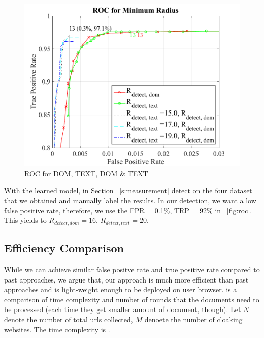 \begin{figure}[t]
  \centering
  \includegraphics[width=.5\textwidth]{fig/roc}
  \caption{ROC for DOM, TEXT, DOM \& TEXT}
  \label{fig:roc}
\end{figure}

With the learned model, in Section ~\autoref{s:measurement} 
detect on the four dataset that we obtained and
manually label the results. In our detection, we want a low false positive rate,
therefore, we use the FPR = 0.1\%, TRP = 92\% in ~\autoref{fig:roc}. This yields
to $R_{detect, dom} = 16$, $R_{detect, text} = 20$.


\subsection{Efficiency Comparison}
While we can achieve similar false positve rate and true positive rate compared
to past approaches, we argue that, our approach is much more efficient than past
approaches and is light-weight enough to be deployed on user browser.
 is a comparison of time complexity and number of rounds that the
documents need to be processed (each time they get smaller amount of document,
though). Let $N$ denote the number of total urls collected, $M$ denoete the
number of cloaking websites. The time complexity is .

